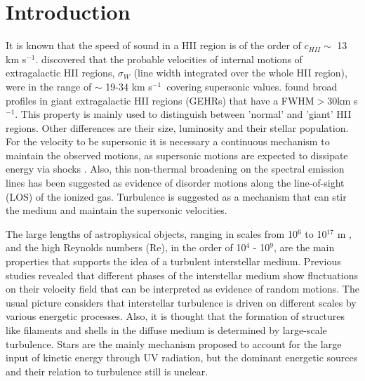 \documentclass[fleqn,usenatbib, useAMS, a4paper]{mnras}
\newcommand\kms{$^{-1}$}
\begin{document}
\section{Introduction}

It is known that the speed of sound in a HII region is of the order of \(c_{HII} \sim\) 13 km s\kms.
\citet{smith1970} discovered that the probable velocities of internal motions of extragalactic HII regions, \(\sigma_{W}\) (line width integrated over the whole HII region), were in the range of $\sim$ 19-34 km s\kms\ covering supersonic values.
\citet{skillman1984kinematics} found broad profiles in giant extragalactic HII regions (GEHRs) that have a FWHM\(>\)30km s\kms. 
This property is mainly used to distinguish between 'normal' and 'giant' HII regions. Other differences are their size, luminosity and their stellar population. 
For the velocity to be supersonic it is necessary a continuous mechanism to maintain the observed motions, as supersonic motions are expected to dissipate energy via shocks \citep{1994Ap&SS.216..285C}. 
Also, this non-thermal broadening on the spectral emission lines has been suggested as evidence of disorder motions along the line-of-sight (LOS) of the ionized gas. 
Turbulence is suggested as a mechanism that can stir the medium and maintain the supersonic velocities. 

The large lengths of astrophysical objects, ranging in scales from 10$^{6}$ to 10$^{17}$ m \citep{2010ApJ...710..853C}, and the high Reynolds numbers (Re), in the order of 10$^{4}$ - 10$^{9}$, are the main properties that supports the idea of a turbulent interstellar medium.
Previous studies \citep{1999intu.conf.....F,2004ARA&A..42..211E,scalo2004interstellar} revealed that different phases of the interstellar medium show fluctuations on their velocity field that can be interpreted as evidence of random motions.
The usual picture considers that interstellar turbulence is driven on different scales by various energetic processes.
Also, it is thought that the formation of structures like filaments and shells in the diffuse medium is determined by large-scale turbulence.
Stars are the mainly mechanism proposed to account for the large input of kinetic energy through UV radiation, but the dominant energetic sources and their relation to turbulence still is unclear.
\end{document}
